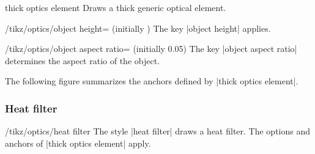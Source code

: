 \documentclass[a4paper]{ltxdoc}
\begin{document}
\begin{shape}{thick optics element}
Draws a thick generic optical element.

\begin{codeexample}[width=6cm]
\end{codeexample}


\begin{key}{/tikz/optics/object height= (initially )}
    The key |object height| applies.
\end{key}


\begin{key}{/tikz/optics/object aspect ratio= (initially 0.05)}
    The key |object aspect ratio| determines the aspect ratio of the object.
\end{key}




The following figure summarizes the anchors defined by |thick optics element|.

\begin{codeexample}[]
\Huge
{}
\end{codeexample}

\end{shape}

\subsubsection{Heat filter}

\begin{stylekey}{/tikz/optics/heat filter}
The style |heat filter| draws a heat filter.
The options and anchors of |thick optics element| apply.

\begin{codeexample}[width=6cm]
\end{codeexample}
\end{stylekey}
\end{document}

